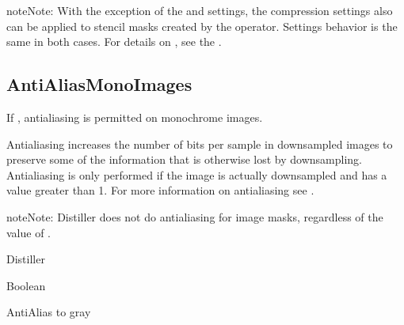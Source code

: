 \documentclass[letterpaper,12pt,english,openany,oneside]{sphinxmanual}
\begin{document}
\begin{sphinxadmonition}{note}{Note:}
With the exception of the  and  settings, the compression settings also can be applied to stencil masks created by the  operator. Settings behavior is the same in both cases. For details on  , see the  .
\end{sphinxadmonition}




\subsection{AntiAliasMonoImages}
\label{\detokenize{PDF_Create_CommonSettings:antialiasmonoimages}}
If  , anti\sphinxhyphen{}aliasing is permitted on monochrome images.

Anti\sphinxhyphen{}aliasing increases the number of bits per sample in downsampled images to preserve some of the information that is otherwise lost by downsampling. Anti\sphinxhyphen{}aliasing is only performed if the image is actually downsampled and  has a value greater than 1. For more information on anti\sphinxhyphen{}aliasing see .

\begin{sphinxadmonition}{note}{Note:}
Distiller does not do anti\sphinxhyphen{}aliasing for image masks, regardless of the value of  .
\end{sphinxadmonition}
\label{\detokenize{PDF_Create_CommonSettings:supported-by-54}}

Distiller

\label{\detokenize{PDF_Create_CommonSettings:type-54}}

Boolean

\label{\detokenize{PDF_Create_CommonSettings:ui-name-41}}

Anti\sphinxhyphen{}Alias to gray

\label{\detokenize{PDF_Create_CommonSettings:default-value-50}}

\begin{sphinxVerbatim}[commandchars=\\\{\}]
\end{sphinxVerbatim}
\end{document}

